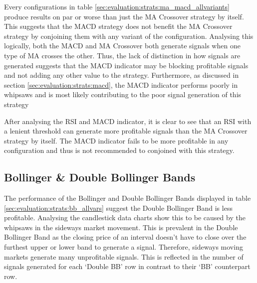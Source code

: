 \noindent Every configurations in table \ref{sec:evaluation:strats:ma_macd_allvariants} produce results on par or worse than just the MA Crossover strategy by itself. This suggests that the MACD strategy does not benefit the MA Crossover strategy by conjoining them with any variant of the configuration. Analysing this logically, both the MACD and MA Crossover both generate signals when one type of MA crosses the other. Thus, the lack of distinction in how signals are generated suggests that the MACD indicator may be blocking profitable signals and not adding any other value to the strategy. Furthermore, as discussed in section \ref{sec:evaluation:strats:macd}, the MACD indicator performs poorly in whipsaws and is most likely contributing to the poor signal generation of this strategy

After analysing the RSI and MACD indicator, it is clear to see that an RSI with a lenient threshold can generate more profitable signals than the MA Crossover strategy by itself. The MACD indicator fails to be more profitable in any configuration and thus is not recommended to conjoined with this strategy.

\subsection{Bollinger \& Double Bollinger Bands}
\label{sec:evaluation:strats:bb_double_bb}

\noindent The performance of the Bollinger and Double Bollinger Bands displayed in table \ref{sec:evaluation:strats:bb_allvars} suggest the Double Bollinger Band is less profitable. Analysing the candlestick data charts show this to be caused by the whipsaws in the sideways market movement. This is prevalent in the Double Bollinger Band as the closing price of an interval doesn't have to close over the furthest upper or lower band to generate a signal. Therefore, sideways moving markets generate many unprofitable signals. This is reflected in the number of signals generated for each `Double BB' row in contrast to their `BB' counterpart row.

